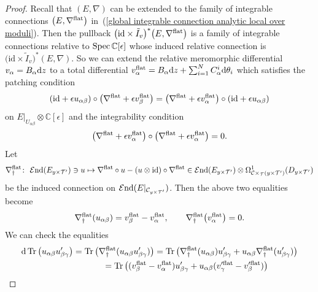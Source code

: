 \documentclass[pdftex]{sigma}
\numberwithin{equation}{section}
\newcommand{\Tr}{\mathop{\rm Tr}\nolimits}
\newcommand\Spec{\mathop{\rm Spec}\nolimits}
\begin{document}
\begin{proof}
Recall that $(E,\nabla)$ can be extended to the family of integrable connections
$\big(E,\nabla^{\rm flat}\big)$ in~(\ref{global integrable connection analytic local over moduli}).
Then the pullback
$\big(\mathrm{id}\times\tilde{I}_v\big)^*\big(E,\nabla^{\rm flat}\big)$
is a family of integrable connections relative to $\Spec\mathbb{C}[\epsilon]$
whose induced relative connection is
$\big(\mathrm{id}\times\tilde{I}_v\big)^*(E,\nabla)$.
So we can extend the relative meromorphic differential
$v_{\alpha}=B_{\alpha}{\rm d}z$ to a total differential
$v^{\rm flat}_{\alpha}=B_{\alpha}{\rm d}z+\sum_{i=1}^N C^i_{\alpha}{\rm d}\theta_i$
which satisfies the patching condition
\[
 (\mathrm{id}+\epsilon u_{\alpha\beta})\circ\big(\nabla^{\rm flat}+\epsilon v^{\rm flat}_{\beta}\big)
 =
 \big(\nabla^{\rm flat}+\epsilon v^{\rm flat}_{\alpha}\big)\circ(\mathrm{id}+\epsilon u_{\alpha\beta})
\]
on $E|_{U_{\alpha\beta}}\otimes\mathbb{C}[\epsilon]$
and the integrability condition
\[
 \big(\nabla^{\rm flat}+\epsilon v^{\rm flat}_{\alpha}\big)
 \circ\big(\nabla^{\rm flat}+\epsilon v^{\rm flat}_{\alpha}\big)
 =0.
\]
Let
\begin{gather*}
 \nabla^{\rm flat}_{\dag}\colon \
 {\mathcal E}{\rm nd}(E_{y\times{\mathcal T'}})
 \ni u \mapsto \nabla^{\rm flat}\circ u-(u\otimes\mathrm{id})\circ \nabla^{\rm flat}
 \in {\mathcal E}{\rm nd}(E_{y\times{\mathcal T'}})\otimes
 \Omega^1_{{\mathcal C}\times_{\mathcal T}(y\times {\mathcal T}')}(D_{y\times{\mathcal T}'})
\end{gather*}
be the induced connection on ${\mathcal E}{\rm nd}(E|_{{\mathcal C}_{y\times{\mathcal T'}}})$.
Then the above two equalities become
\begin{gather*}
 \nabla^{\rm flat}_{\dag}(u_{\alpha\beta})
 =
 v_{\beta}^{\rm flat}-v_{\alpha}^{\rm flat}, \qquad
 \nabla^{\rm flat}_{\dag}\big(v^{\rm flat}_{\alpha}\big) =0.
\end{gather*}
We can check the equalities
\begin{gather*}
 {\rm d} \Tr\big(u_{\alpha\beta}u'_{\beta\gamma}\big)
 =
 \Tr\big(\nabla^{\rm flat}_{\dag}(u_{\alpha\beta}u'_{\beta\gamma})\big)
 =
 \Tr\big( \nabla^{\rm flat}_{\dag}(u_{\alpha\beta})u'_{\beta\gamma}
 +u_{\alpha\beta}\nabla^{\rm flat}_{\dag}(u'_{\beta\gamma})\big)
 \\
 \hphantom{{\rm d} \Tr\big(u_{\alpha\beta}u'_{\beta\gamma}\big)}{}
 =
 \Tr \big( ( v_{\beta}^{\rm flat}- v_{\alpha}^{\rm flat} ) u'_{\beta\gamma}
 +u_{\alpha\beta} ( v'^{\rm flat}_{\gamma} - v'^{\rm flat}_{\beta}) \big)
 \\

\end{gather*}
\end{proof}
\end{document}
